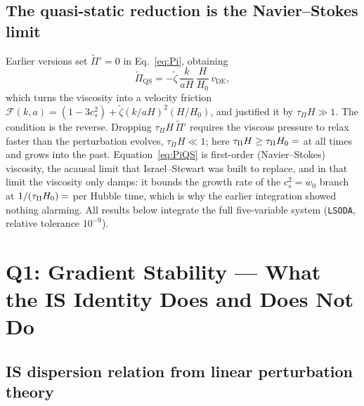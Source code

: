 \documentclass[12pt,a4paper]{article}
\newcommand{\tauPi}{\tau_\Pi}
\newcommand{\ztilde}{\tilde{\zeta}}
\newcommand{\Pitilde}{\tilde{\Pi}}
\begin{document}
\subsection{The quasi-static reduction is the Navier--Stokes limit}
\label{subsec:QS}

Earlier versions set $\Pitilde' = 0$ in Eq.~\eqref{eq:Pi}, obtaining
\begin{equation}
  \Pitilde_{\mathrm{QS}} = -\ztilde\,\frac{k}{aH}\,\frac{H}{H_0}\,v_{\mathrm{DE}},
  \label{eq:PiQS}
\end{equation}
which turns the viscosity into a velocity friction
$\mathcal{F}(k,a) = (1-3c^2_s) + \ztilde(k/aH)^2(H/H_0)$, and justified it by
$\tauPi H \gg 1$. The condition is the reverse. Dropping $\tauPi H\,\Pitilde'$
requires the viscous pressure to relax faster than the perturbation evolves,
$\tauPi H \ll 1$; here $\tauPi H \geq \tauPi H_0 = \val{TAU_PI_H0_d3}$ at all times and grows
into the past. Equation~\eqref{eq:PiQS} is first-order (Navier--Stokes) viscosity,
the acausal limit that Israel--Stewart was built to replace, and in that limit the
viscosity only damps: it bounds the growth rate of the $c^2_s=w_0$ branch at
$1/(\tauPi H_0)=\val{p5_lamNS}$ per Hubble time, which is why the earlier integration
showed nothing alarming. All results below integrate the full five-variable system
(\texttt{LSODA}, relative tolerance $10^{-9}$).

\section{Q1: Gradient Stability --- What the IS Identity Does and Does Not Do}
\label{sec:Q1_stability}

\subsection{IS dispersion relation from linear perturbation theory}
\label{subsec:dispersion}
\end{document}
